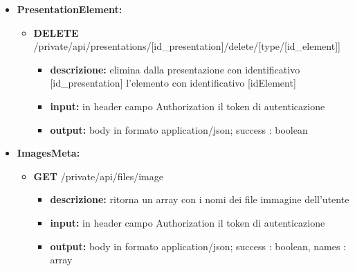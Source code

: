 {{\begin{itemize}
		\item \textbf{PresentationElement:}
			\begin{itemize}
			\item   \textbf{DELETE} /private/api/presentations/[id\_presentation]/delete/[type/[id\_element]]
				\begin{itemize} 
				\item \textbf{descrizione:} elimina dalla presentazione con identificativo [id\_presentation] l'elemento con identificativo [idElement]						
				\item \textbf{input:} in header campo Authorization il token di autenticazione
				\item \textbf{output:} body in formato application/json; success : boolean
				\end{itemize}
			\end{itemize}
			
			
		\item \textbf{ImagesMeta:}
			\begin{itemize}
			\item   \textbf{GET} /private/api/files/image 
				\begin{itemize} 
				\item \textbf{descrizione:} ritorna un array con i nomi dei file immagine dell'utente
				\item \textbf{input:} in header campo Authorization il token di autenticazione
				\item \textbf{output:} body in formato application/json; success : boolean, names : array
				\end{itemize}
			\end{itemize}
			

\end{itemize}}}
